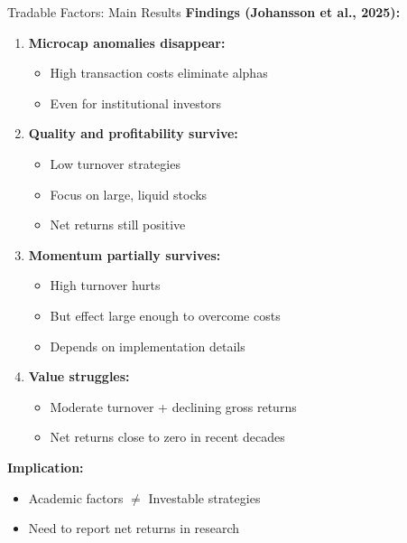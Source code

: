 \documentclass{beamer}
\begin{document}
\begin{frame}{Tradable Factors: Main Results}
    \textbf{Findings (Johansson et al., 2025):}
    
    
    \begin{enumerate}
        \item \textbf{Microcap anomalies disappear:}
        \begin{itemize}
            \item High transaction costs eliminate alphas
            \item Even for institutional investors
        \end{itemize}
        
        \item \textbf{Quality and profitability survive:}
        \begin{itemize}
            \item Low turnover strategies
            \item Focus on large, liquid stocks
            \item Net returns still positive
        \end{itemize}
        
        \item \textbf{Momentum partially survives:}
        \begin{itemize}
            \item High turnover hurts
            \item But effect large enough to overcome costs
            \item Depends on implementation details
        \end{itemize}
        
        \item \textbf{Value struggles:}
        \begin{itemize}
            \item Moderate turnover + declining gross returns
            \item Net returns close to zero in recent decades
        \end{itemize}
    \end{enumerate}
    
    
    \textbf{Implication:}
    \begin{itemize}
        \item Academic factors $\neq$ Investable strategies
        \item Need to report net returns in research
    \end{itemize}
\end{frame}
\end{document}
